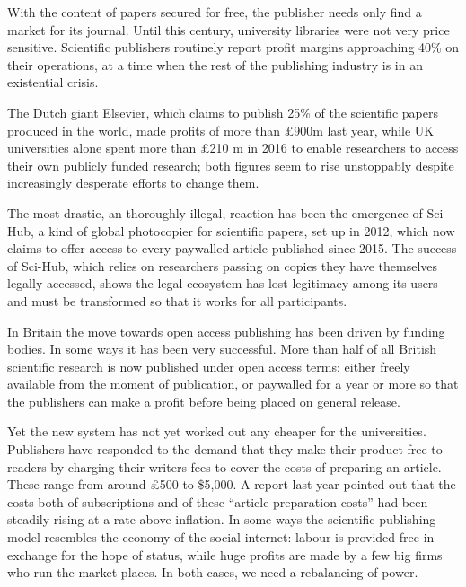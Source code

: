 With the content of papers secured for free, the publisher needs only
find a market for its journal. Until this century, university libraries
were not very price sensitive. Scientific publishers routinely report
profit margins approaching 40\% on their operations, at a time when the
rest of the publishing industry is in an existential crisis.

The Dutch giant Elsevier, which claims to publish 25\% of the scientific
papers produced in the world, made profits of more than £900m last year,
while UK universities alone spent more than £210 m in 2016 to enable
researchers to access their own publicly funded research; both figures
seem to rise unstoppably despite increasingly desperate efforts to
change them.

The most drastic, an thoroughly illegal, reaction has been the emergence
of Sci-Hub, a kind of global photocopier for scientific papers, set up
in 2012, which now claims to offer access to every paywalled article
published since 2015. The success of Sci-Hub, which relies on
researchers passing on copies they have themselves legally accessed,
shows the legal ecosystem has lost legitimacy among its users and must
be transformed so that it works for all participants.

In Britain the move towards open access publishing has been driven by
funding bodies. In some ways it has been very successful. More than half
of all British scientific research is now published under open access
terms: either freely available from the moment of publication, or
paywalled for a year or more so that the publishers can make a profit
before being placed on general release.

Yet the new system has not yet worked out any cheaper for the
universities. Publishers have responded to the demand that they make
their product free to readers by charging their writers fees to cover
the costs of preparing an article. These range from around £500 to
\$5,000.  A report last year pointed out that the costs both of
subscriptions and of these ``article preparation costs'' had been
steadily rising at a rate above inflation.
In some ways the scientific publishing model resembles the economy of
the social internet: labour is provided free in exchange for the hope of
status, while huge profits are made by a few big firms who run the
market places. In both cases, we need a rebalancing of power.

